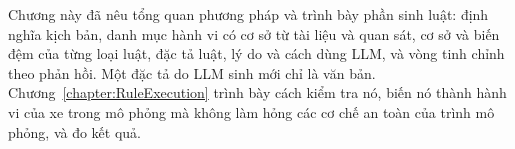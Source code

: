 \documentclass[../main.tex]{subfiles}
\begin{document}
\medskip

Chương này đã nêu tổng quan phương pháp và trình bày phần sinh luật: định nghĩa kịch bản, danh mục hành vi có cơ sở từ tài liệu và quan sát, cơ sở và biến đệm của từng loại luật, đặc tả luật, lý do và cách dùng LLM, và vòng tinh chỉnh theo phản hồi. Một đặc tả do LLM sinh mới chỉ là văn bản. Chương~\ref{chapter:RuleExecution} trình bày cách kiểm tra nó, biến nó thành hành vi của xe trong mô phỏng mà không làm hỏng các cơ chế an toàn của trình mô phỏng, và đo kết quả.
\end{document}
